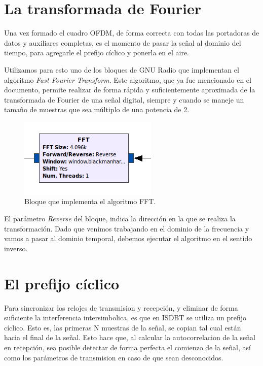 \section{La transformada de Fourier}

Una vez formado el cuadro OFDM, de forma correcta con todas las portadoras de datos y auxiliares completas, es el momento de pasar la señal al dominio del tiempo, para agregarle el prefijo cíclico y ponerla en el aire. 

Utilizamos para esto uno de los bloques de GNU Radio que implementan el algoritmo \textit{Fast Fourier Transform}. Este algoritmo, que ya fue mencionado en el documento, permite realizar de forma rápida y suficientemente aproximada de la transformada de Fourier de una señal digital, siempre y cuando se maneje un tamaño de muestras que sea múltiplo de una potencia de 2.

\begin{figure}[!h]
	\centering
	\includegraphics[scale=0.5]{figuras/cap05/fft}
	\caption{\label{f:fft} Bloque que implementa el algoritmo FFT.}
\end{figure}

El parámetro \textit{Reverse} del bloque, indica la dirección en la que se realiza la transformación. Dado que venimos trabajando en el dominio de la frecuencia y vamos a pasar al dominio temporal, debemos ejecutar el algoritmo en el sentido inverso.

\section{El prefijo cíclico}

Para sincronizar los relojes de transmision y recepción, y eliminar de forma suficiente la interferencia intersimbolica, es que en ISDBT se utiliza un prefijo cíclico. Esto es, las primeras N muestras de la señal, se copian tal cual están hacia el final de la señal. Esto hace que, al calcular la autocorrelacion de la señal en recepción, sea posible detectar de forma perfecta el comienzo de la señal, así como los parámetros de transmision en caso de que sean desconocidos. 

